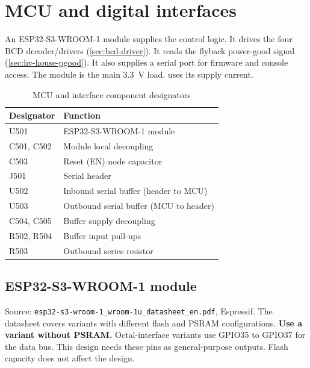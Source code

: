 \section{MCU and digital interfaces}
\label{sec:esp32-mcu}

An ESP32-S3-WROOM-1 module supplies the control logic. It drives the four BCD
decoder/drivers (\cref{sec:bcd-driver}). It reads the flyback power-good signal
(\cref{sec:hv-house-pgood}). It also supplies a serial port for firmware and
console access. The module is the main 3.3~V load.
 uses its supply current.

\begin{table}[htbp]
\centering
\caption{MCU and interface component designators}\label{tab:esp32-designators}
\begin{tabular}{|l|l|}
\hline
\textbf{Designator} & \textbf{Function} \\
\hline
U501 & ESP32-S3-WROOM-1 module \\
\hline
C501, C502 & Module local decoupling \\
\hline
C503 & Reset (EN) node capacitor \\
\hline
J501 & Serial header \\
\hline
U502 & Inbound serial buffer (header to MCU) \\
\hline
U503 & Outbound serial buffer (MCU to header) \\
\hline
C504, C505 & Buffer supply decoupling \\
\hline
R502, R504 & Buffer input pull-ups \\
\hline
R503 & Outbound series resistor \\
\hline
\end{tabular}
\end{table}

\subsection{ESP32-S3-WROOM-1 module}
\label{sec:esp32}

Source: \texttt{esp32-s3-wroom-1\_wroom-1u\_datasheet\_en.pdf}, Espressif. The
datasheet covers variants with different flash and PSRAM configurations.
\textbf{Use a variant without PSRAM.} Octal-interface variants use GPIO35 to
GPIO37 for the data bus. This design needs these pins as general-purpose
outputs. Flash capacity does not affect the design.

